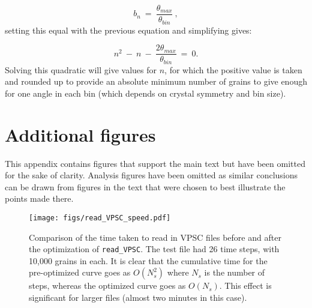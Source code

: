\documentclass[a4paper,12pt,twoside]{report}
\numberwithin{equation}{chapter}
\begin{document}
\begin{equation} \label{App:eq:nbins}
b_n\ =\ \frac{\theta_{max}}{\theta_{bin}}\ ,
\end{equation}
\noindent
setting this equal with the previous equation and simplifying gives:

\begin{equation}
n^2\ -\ n\ -\ \frac{2\theta_{max}}{\theta_{bin}}\ =\ 0.
\end{equation}
\noindent
Solving this quadratic will give values for $n$, for which the positive value is taken and rounded up to provide an absolute minimum number of grains to give enough for one angle in each bin (which depends on crystal symmetry and bin size).

\newpage
\section{Additional figures} \label{App:analysis_figs}
This appendix contains figures that support the main text but have been omitted for the sake of clarity. Analysis figures have been omitted as similar conclusions can be drawn from figures in the text that were chosen to best illustrate the points made there. 
\\

\begin{figure}[h!]
  \centering
    \texttt{[image: figs/read\_VPSC\_speed.pdf]}
  \caption[Read VPSC optimization]{Comparison of the time taken to read in VPSC files before and after the optimization of \texttt{read\_{}VPSC}. The test file had 26 time steps, with 10,000 grains in each. It is clear that the cumulative time for the pre-optimized curve goes as $O(N_s^2)$ where $N_s$ is the number of steps, whereas the optimized curve goes as $O(N_s)$. This effect is significant for larger files (almost two minutes in this case).}
  \label{fig:app:read_VPSC}
\end{figure} 

\end{document}
